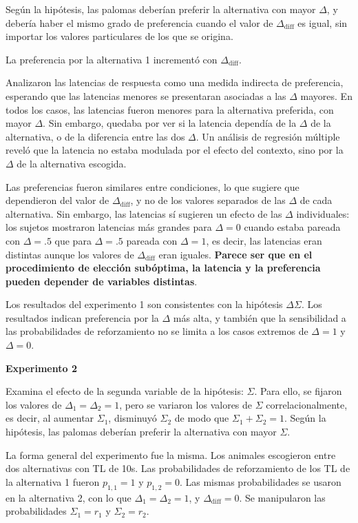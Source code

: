 \documentclass[a4paper,12pt]{article}
\begin{document}
Según la hipótesis, las palomas deberían preferir la alternativa con mayor $\Delta$, y debería haber el mismo grado de preferencia cuando el valor de $\Delta_{\mbox{diff}}$ es igual, sin importar los valores particulares de los que se origina.

La preferencia por la alternativa 1 incrementó con $\Delta_{\mbox{diff}}$.

Analizaron las latencias de respuesta como una medida indirecta de preferencia, esperando que las latencias menores se presentaran asociadas a las $\Delta$ mayores. En todos los casos, las latencias fueron menores para la alternativa preferida, con mayor $\Delta$. Sin embargo, quedaba por ver si la latencia dependía de la $\Delta$ de la alternativa, o de la diferencia entre las dos $\Delta$. Un análisis de regresión múltiple reveló que la latencia no estaba modulada por el efecto del contexto, sino por la $\Delta$ de la alternativa escogida.

Las preferencias fueron similares entre condiciones, lo que sugiere que dependieron del valor de $\Delta_{\mbox{diff}}$, y no de los valores separados de las $\Delta$ de cada alternativa. Sin embargo, las latencias sí sugieren un efecto de las $\Delta$ individuales: los sujetos mostraron latencias más grandes para $\Delta=0$ cuando estaba pareada con $\Delta={.}5$ que para $\Delta={.}5$ pareada con $\Delta=1$, es decir, las latencias eran distintas aunque los valores de $\Delta_{\mbox{diff}}$ eran iguales. {\bfseries Parece ser que en el procedimiento de elección subóptima, la latencia y la preferencia pueden depender de variables distintas}.

Los resultados del experimento 1 son consistentes con la hipótesis $\Delta\Sigma$. Los resultados indican preferencia por la $\Delta$ más alta, y también que la sensibilidad a las probabilidades de reforzamiento no se limita a los casos extremos de $\Delta=1$ y $\Delta=0$.

{\bfseries Experimento 2}

Examina el efecto de la segunda variable de la hipótesis: $\Sigma$. Para ello, se fijaron los valores de $\Delta_1=\Delta_2=1$, pero se variaron los valores de $\Sigma$ correlacionalmente, es decir, al aumentar $\Sigma_1$, disminuyó $\Sigma_ 2$ de modo que $\Sigma_1+\Sigma_2=1$. Según la hipótesis, las palomas deberían preferir la alternativa con mayor $\Sigma$.

La forma general del experimento fue la misma. Los animales escogieron entre dos alternativas con TL de 10s. Las probabilidades de reforzamiento de los TL de la alternativa 1 fueron $p_{1,1}=1$ y $p_{1,2}=0$. Las mismas probabilidades se usaron en la alternativa 2, con lo que $\Delta_1=\Delta_2=1$, y $\Delta_{\mbox{diff}}=0$. Se manipularon las probabilidades $\Sigma_1=r_1$ y $\Sigma_2=r_2$.
\end{document}

